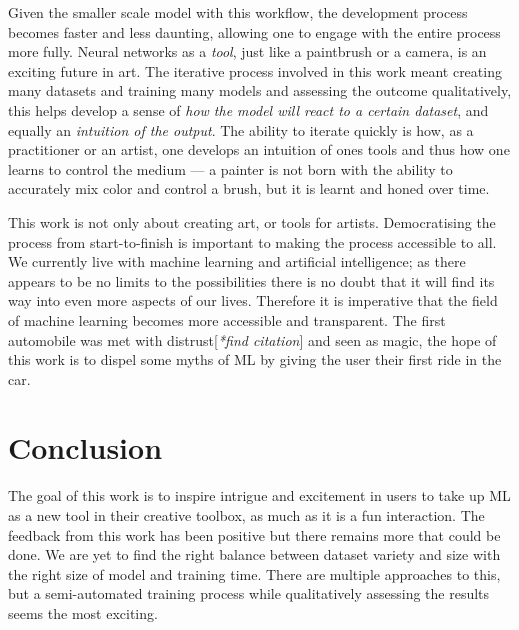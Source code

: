 \documentclass{article}
\begin{document}
Given the smaller scale model with this workflow, the development process becomes faster and less daunting, allowing one to engage with the entire process more fully. Neural networks as a \textit{tool}, just like a paintbrush or a camera, is an exciting future in art. The iterative process involved in this work meant creating many datasets and training many models and assessing the outcome qualitatively, this helps develop a sense of \textit{how the model will react to a certain dataset}, and equally an \textit{intuition of the output}. The ability to iterate quickly is how, as a practitioner or an artist, one develops an intuition of ones tools and thus how one learns to control the medium --- a painter is not born with the ability to accurately mix color and control a brush, but it is learnt and honed over time.

This work is not only about creating art, or tools for artists. Democratising the process from start-to-finish is important to making the process accessible to all. We currently live with machine learning and artificial intelligence; as there appears to be no limits to the possibilities there is no doubt that it will find its way into even more aspects of our lives. Therefore it is imperative that the field of machine learning becomes more accessible and transparent. The first automobile was met with distrust[\emph{*find citation}] and seen as magic, the hope of this work is to dispel some myths of ML by giving the user their first ride in the car.

\section{Conclusion}
The goal of this work is to inspire intrigue and excitement in users to take up ML as a new tool in their creative toolbox, as much as it is a fun interaction. The feedback from this work has been positive but there remains more that could be done. We are yet to find the right balance between dataset variety and size with the right size of model and training time. There are multiple approaches to this, but a semi-automated training process while qualitatively assessing the results seems the most exciting.
\end{document}
